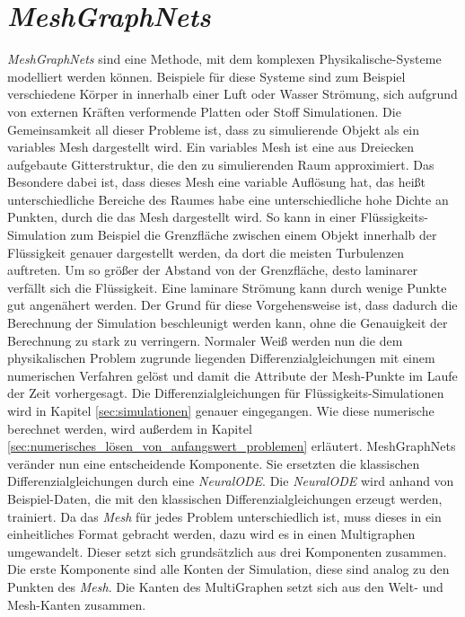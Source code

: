 

\section{\textit{MeshGraphNets}} \label{sec:meshgraphnets}

\textit{MeshGraphNets} \cite{meshgraphnets} sind eine Methode, mit dem komplexen Physikalische-Systeme modelliert werden können.
Beispiele für diese Systeme sind zum Beispiel verschiedene Körper in innerhalb einer Luft oder Wasser Strömung, 
sich aufgrund von externen Kräften verformende Platten oder Stoff Simulationen.
Die Gemeinsamkeit all dieser Probleme ist, dass zu simulierende Objekt als ein variables Mesh dargestellt wird.
Ein variables Mesh ist eine aus Dreiecken aufgebaute Gitterstruktur, die den zu simulierenden Raum approximiert.
Das Besondere dabei ist, dass dieses Mesh eine variable Auflösung hat, das heißt unterschiedliche Bereiche des Raumes 
habe eine unterschiedliche hohe Dichte an Punkten, durch die das Mesh dargestellt wird.
So kann in einer Flüssigkeits-Simulation zum Beispiel die Grenzfläche zwischen einem Objekt innerhalb der Flüssigkeit
genauer dargestellt werden, da dort die meisten Turbulenzen auftreten.
Um so größer der Abstand von der Grenzfläche, desto laminarer verfällt sich die Flüssigkeit.
Eine laminare Strömung kann durch wenige Punkte gut angenähert werden.
Der Grund für diese Vorgehensweise ist, dass dadurch die Berechnung der Simulation beschleunigt werden kann,
ohne die Genauigkeit der Berechnung zu stark zu verringern.
Normaler Weiß werden nun die dem physikalischen Problem zugrunde liegenden Differenzialgleichungen mit einem numerischen Verfahren gelöst 
und damit die Attribute der Mesh-Punkte im Laufe der Zeit vorhergesagt.
Die Differenzialgleichungen für Flüssigkeits-Simulationen wird in Kapitel \ref{sec:simulationen} genauer eingegangen.
Wie diese numerische berechnet werden, wird außerdem in Kapitel \ref{sec:numerisches_lösen_von_anfangswert_problemen} erläutert.
MeshGraphNets veränder nun eine entscheidende Komponente.
Sie ersetzten die klassischen Differenzialgleichungen durch eine \textit{NeuralODE}.
Die \textit{NeuralODE} wird anhand von Beispiel-Daten, die mit den klassischen Differenzialgleichungen erzeugt werden, trainiert.
Da das \textit{Mesh} für jedes Problem unterschiedlich ist, muss dieses in ein einheitliches Format gebracht werden, dazu wird es in einen
Multigraphen umgewandelt.
Dieser setzt sich grundsätzlich aus drei Komponenten zusammen.
Die erste Komponente sind alle Konten der Simulation, diese sind analog zu den Punkten des \textit{Mesh}.
Die Kanten des MultiGraphen setzt sich aus den Welt- und Mesh-Kanten zusammen.

